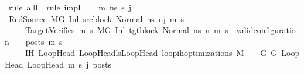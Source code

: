 \begin{isabellebody}
\ {\isacharparenleft}{\kern0pt}rule\ allI\ {\isacharbar}{\kern0pt}\ rule\ impI{\isacharparenright}{\kern0pt}{\isacharplus}{\kern0pt}\isanewline
\ \ \isamarkupfalse%
\ m{\isacharprime}{\kern0pt}\ ns\ s{\isacharprime}{\kern0pt}\ j\isanewline
\ \ \isamarkupfalse%
\ RedSource{\isacharcolon}{\kern0pt}\ {\isachardoublequoteopen}M{\isacharcomma}{\kern0pt}{\isasymLambda}{\isacharcomma}{\kern0pt}{\isasymGamma}{\isacharcomma}{\kern0pt}{\isasymOmega}{\isacharcomma}{\kern0pt}G\ {\isasymturnstile}{\isacharparenleft}{\kern0pt}Inl\ src{\isacharunderscore}{\kern0pt}block{\isacharcomma}{\kern0pt}\ Normal\ ns{\isacharparenright}{\kern0pt}\ {\isacharminus}{\kern0pt}n{\isasymrightarrow}{\isacharcircum}{\kern0pt}j\ {\isacharparenleft}{\kern0pt}m{\isacharprime}{\kern0pt}{\isacharcomma}{\kern0pt}\ s{\isacharprime}{\kern0pt}{\isacharparenright}{\kern0pt}{\isachardoublequoteclose}\ \isanewline
\ \ \ \ \ TargetVerifies{\isacharcolon}{\kern0pt}\ {\isachardoublequoteopen}{\isasymforall}m{}{\isacharprime}{\kern0pt}\ s{}{\isacharprime}{\kern0pt}{\isachardot}{\kern0pt}\ {\isacharparenleft}{\kern0pt}M{\isacharcomma}{\kern0pt}{\isasymLambda}{\isacharcomma}{\kern0pt}{\isasymGamma}{\isacharcomma}{\kern0pt}{\isasymOmega}{\isacharcomma}{\kern0pt}G{\isacharprime}{\kern0pt}\ {\isasymturnstile}{\isacharparenleft}{\kern0pt}Inl\ tgt{\isacharunderscore}{\kern0pt}block{\isacharcomma}{\kern0pt}\ Normal\ ns{\isacharparenright}{\kern0pt}\ {\isacharminus}{\kern0pt}n{\isasymrightarrow}{\isacharasterisk}{\kern0pt}\ {\isacharparenleft}{\kern0pt}m{}{\isacharprime}{\kern0pt}{\isacharcomma}{\kern0pt}\ s{}{\isacharprime}{\kern0pt}{\isacharparenright}{\kern0pt}{\isacharparenright}{\kern0pt}\ {\isasymlongrightarrow}\ valid{\isacharunderscore}{\kern0pt}configuration\ {\isasymLambda}\ {\isasymGamma}\ {\isasymOmega}\ posts\ m{}{\isacharprime}{\kern0pt}\ s{}{\isacharprime}{\kern0pt}{\isachardoublequoteclose}\ \isanewline
\ \ \ \ \ IH{\isacharcolon}{\kern0pt}\ {\isachardoublequoteopen}{\isasymforall}{\isacharparenleft}{\kern0pt}LoopHead{\isacharcomma}{\kern0pt}\ LoopHead{\isacharprime}{\kern0pt}{\isacharparenright}{\kern0pt}{\isasymin}lsLoopHead{\isachardot}{\kern0pt}\ loop{\isacharunderscore}{\kern0pt}ih{\isacharunderscore}{\kern0pt}optimizations\ M\ {\isasymLambda}\ {\isasymGamma}\ {\isasymOmega}\ G\ G{\isacharprime}{\kern0pt}\ LoopHead\ LoopHead{\isacharprime}{\kern0pt}\ m{\isacharprime}{\kern0pt}\ s{\isacharprime}{\kern0pt}\ j\ posts{\isachardoublequoteclose}\isanewline

\end{isabellebody}
